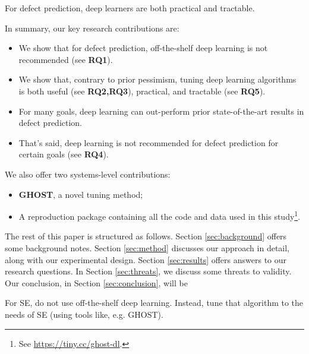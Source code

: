 \documentclass[10pt,compsoc,twocolumn]{IEEEtran}
\begin{document}
\begin{blockquote}
    \noindent
  For defect prediction,  deep learners are both practical and tractable.
\end{blockquote}
\noindent
In summary, our key research contributions are:
\begin{itemize}
\item We show that for defect prediction, off-the-shelf deep learning is not recommended (see {\bf RQ1}).
    \item We show that, contrary to prior pessimism, tuning deep learning  algorithms is both useful (see {\bf RQ2,RQ3}), practical, and tractable (see {\bf RQ5}). 
       \item For many goals,   deep learning can out-perform prior state-of-the-art results in defect prediction. 
\item %
That's said, 
deep learning is not recommended for defect prediction for certain goals (see {\bf RQ4}).
\end{itemize}
  We also offer two systems-level contributions:
    \begin{itemize}
    \item  
    \textbf{GHOST}, a novel
    tuning method;
    \item A reproduction package containing all the code and data used in this study\footnote{See
    \url{https://tiny.cc/ghost-dl}. }.
    \end{itemize}
The rest of this paper is structured as follows. Section \ref{sec:background} offers some  background notes. Section \ref{sec:method} discusses our approach in detail, along with our experimental design. Section \ref{sec:results} offers answers
to our research questions.   In Section \ref{sec:threats}, we discuss some threats to validity. Our  conclusion,  in Section \ref{sec:conclusion}, will be
\begin{blockquote}
    \noindent
    For SE,  do not use   off-the-shelf  deep learning. 
  Instead,
tune that algorithm to the needs of SE (using tools like, e.g. GHOST).
\end{blockquote}
 
\end{document}
